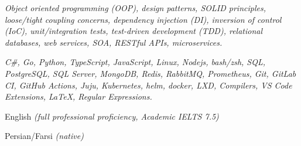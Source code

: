 \documentclass[9pt,a4paper]{extarticle}
\begin{document}
\begin{customitemize}
    \item {}
    \item {}
\end{customitemize}
\sectionrule{}

\begin{customitemize}
    \item {}
    \begin{customitemize}
        \item[] {\textit{Object oriented programming (OOP), design patterns, SOLID principles,
                        loose/tight coupling concerns, dependency injection (DI), inversion of
                        control (IoC), unit/integration tests, test-driven development (TDD),
                        relational databases, web services, SOA, RESTful APIs, microservices.
                    }}
    \end{customitemize}
    \item {}
    \begin{customitemize}
        \item[] {
                    \textit{C\#,
                        Go,
                        Python,
                        TypeScript,
                        JavaScript,
                        Linux,
                        Nodejs,
                        bash/zsh,
                        SQL,
                        PostgreSQL,
                        SQL Server,
                        MongoDB,
                        Redis,
                        RabbitMQ,
                        Prometheus,
                        Git,
                        GitLab CI,
                        GitHub Actions,
                        Juju,
                        Kubernetes,
                        helm,
                        docker,
                        LXD,
                        Compilers,
                        VS Code Extensions,
                        \LaTeX,
                        Regular Expressions.}
              }
    \end{customitemize}
    \item {}
    \begin{customitemize}
        \item {English \textit{(full professional proficiency, Academic IELTS 7.5)}}
        \item {Persian/Farsi \textit{(native)}}
    \end{customitemize}
\end{customitemize}
\sectionrule{}
\end{document}
